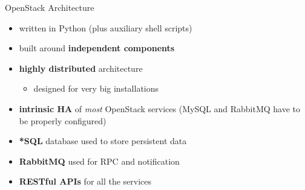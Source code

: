 \documentclass[english,serif,mathserif,usenames,dvipsnames]{beamer}
\begin{document}
\begin{frame}
  {OpenStack Architecture}
  \begin{itemize}
  \item written in Python (plus auxiliary shell scripts)
  \item built around \textbf{independent components}
  \item \textbf{highly distributed} architecture
    \begin{itemize}
    \item designed for very big installations
    \end{itemize}
  \item \textbf{intrinsic HA} of \textit{most} OpenStack services (MySQL and
    RabbitMQ have to be properly configured)
  \item \textbf{*SQL} database used to store persistent data
  \item \textbf{RabbitMQ} used for RPC and notification
  \item \textbf{RESTful APIs} for all the services
  \end{itemize}
\end{frame}
\end{document}
